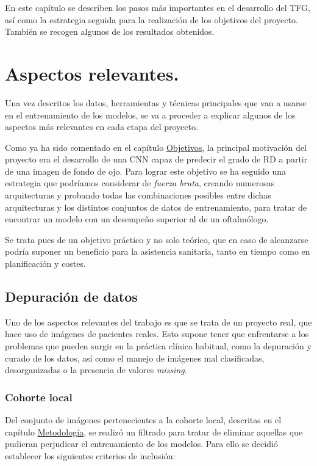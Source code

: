  \label{Conc}

En este capítulo se describen los pasos más importantes en el desarrollo del TFG, así como la estrategia seguida para la realización de los objetivos del proyecto. También se recogen algunos de los resultados obtenidos.

\section{Aspectos relevantes.}

Una vez descritos los datos, herramientas y técnicas principales que van a usarse en el entrenamiento de los modelos, se va a proceder a explicar algunos de los aspectos más relevantes en cada etapa del proyecto.

Como ya ha sido comentado en el capítulo \hyperref[Obj]{Objetivos}, la principal motivación del proyecto era el desarrollo de una CNN capaz de predecir el grado de RD a partir de una imagen de fondo de ojo. Para lograr este objetivo se ha seguido una estrategia que podríamos considerar de \textit{fuerza bruta}, creando numerosas arquitecturas y probando todas las combinaciones posibles entre dichas arquitecturas y los distintos conjuntos de datos de entrenamiento, para tratar de encontrar un modelo con un desempeño superior al de un oftalmólogo. 

Se trata pues de un objetivo práctico y no solo teórico, que en caso de alcanzarse podría suponer un beneficio para la asistencia sanitaria, tanto en tiempo como en planificación y costes.

\subsection{Depuración de datos}

Uno de los aspectos relevantes del trabajo es que se trata de un proyecto real, que hace uso de imágenes de pacientes reales. Esto supone tener que enfrentarse a los problemas que pueden surgir en la práctica clínica habitual, como la depuración y curado de los datos, así como el manejo de imágenes mal clasificadas, desorganizadas o la presencia de valores \textit{missing}. 

\subsubsection{Cohorte local}

Del conjunto de imágenes pertenecientes a la cohorte local, descritas en el capítulo \hyperref[Met]{Metodología}, se realizó un filtrado para tratar de eliminar aquellas que pudieran perjudicar el entrenamiento de los modelos. Para ello se decidió establecer los siguientes criterios de inclusión: 

